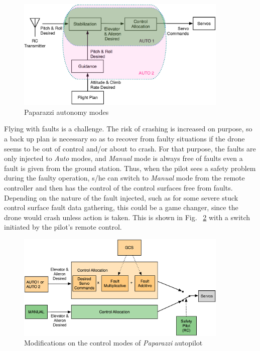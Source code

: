 \begin{figure}[h]
\begin{center}
\includegraphics[width=0.9\textwidth]{figures/pprzControlModes}    %
\caption{Paparazzi autonomy modes} 
\label{fig:paparazziControlModes}
\end{center}
\end{figure}

Flying with faults is a challenge. 
The risk of crashing is increased on purpose, so a back up plan is necessary so as to recover from faulty situations if the drone seems to be out of control and/or about to crash. 
For that purpose, the faults are only injected to \emph{Auto} modes, and \emph{Manual} mode is always free of faults even a fault is given from the ground station. 
Thus, when the pilot sees a safety problem during the faulty operation, s/he can switch to \emph{Manual} mode from the remote controller and then has the control of the control surfaces free from faults. 
Depending on the nature of the fault injected, such as for some severe stuck control surface fault data gathering, this could be a game changer, since the drone would crash unless action is taken.  
This is shown in Fig. ~\ref{fig:faultInjectionPaparazzi} with a switch initiated by the pilot's remote control. 

\begin{figure}[h]
\begin{center}
\includegraphics[width=0.9\textwidth]{figures/faultInjectionPprz}    %
\caption{Modifications on the control modes of \emph{Paparazzi} autopilot} 
\label{fig:faultInjectionPaparazzi}
\end{center}
\end{figure}

